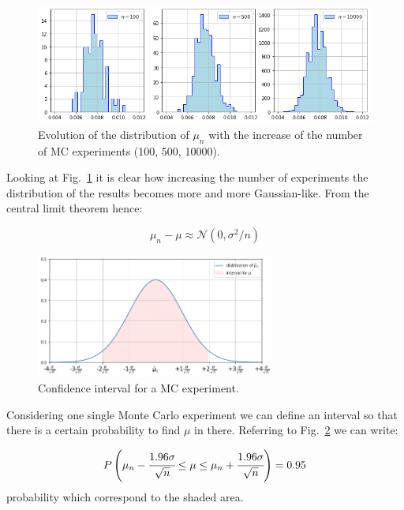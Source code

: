 \begin{figure}[tb]
	\centering
	\includegraphics[width=1\textwidth]{figures/lesson4_25_0.png}
	\caption{Evolution of the distribution of $\mu_n$ with the increase of
	the number of MC experiments (100, 500, 10000).}
\label{fig:repeated_MC}
\end{figure}

Looking at Fig.~\ref{fig:repeated_MC} it is clear how increasing the number of
experiments the distribution of the results becomes more and more Gaussian-like.
From the central limit theorem hence: 

\begin{equation}
\mu_n - \mu \approx \mathcal{N}(0, \sigma^2/n)
\end{equation}

\begin{figure}[tb]
	\centering
	\includegraphics[width=0.7\textwidth]{figures/confidence_interval.png}
	\caption{Confidence interval for a MC experiment.}
	\label{fig:confidence_interval}
\end{figure}

Considering one single Monte Carlo experiment we can define an
interval so that there is a certain probability to find \(\mu\) in
there. Referring to Fig.~\ref{fig:confidence_interval} we can write:

\begin{equation}
P\left(\mu_n - \cfrac{1.96\sigma}{\sqrt{n}}\le \mu \le \mu_n + \cfrac{1.96\sigma}{\sqrt{n}}\right) = 0.95
\end{equation}
probability which correspond to the shaded area.

